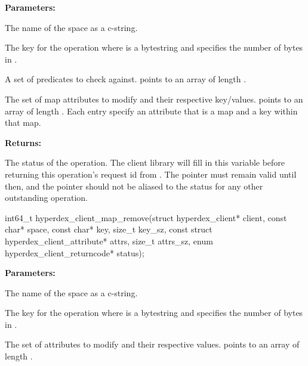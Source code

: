 \noindent\textbf{Parameters:}
\begin{description}[labelindent=\widthof{{\code{mapattrs}, \code{mapattrs\_sz}}},leftmargin=*,noitemsep,nolistsep,align=right]
\item[\code{space}] The name of the space as a c-string.
\item[\code{key}, \code{key\_sz}] The key for the operation where  is a bytestring and  specifies the number of bytes in .
\item[\code{checks}, \code{checks\_sz}] A set of predicates to check against.   points to an array of length .
\item[\code{mapattrs}, \code{mapattrs\_sz}] The set of map attributes to modify and their respective key/values.   points to an array of length .  Each entry specify an attribute that is a map and a key within that map.
\end{description}

\noindent\textbf{Returns:}
\begin{description}[labelindent=\widthof{{\code{status}}},leftmargin=*,noitemsep,nolistsep,align=right]
\item[\code{status}] The status of the operation.  The client library will fill in this variable before returning this operation's request id from .  The pointer must remain valid until then, and the pointer should not be aliased to the status for any other outstanding operation.
\end{description}

\funcsep
{}
\begin{ccode}
int64_t hyperdex_client_map_remove(struct hyperdex_client* client,
                const char* space,
                const char* key, size_t key_sz,
                const struct hyperdex_client_attribute* attrs, size_t attrs_sz,
                enum hyperdex_client_returncode* status);
\end{ccode}
\funcdesc 

\noindent\textbf{Parameters:}
\begin{description}[labelindent=\widthof{{\code{attrs}, \code{attrs\_sz}}},leftmargin=*,noitemsep,nolistsep,align=right]
\item[\code{space}] The name of the space as a c-string.
\item[\code{key}, \code{key\_sz}] The key for the operation where  is a bytestring and  specifies the number of bytes in .
\item[\code{attrs}, \code{attrs\_sz}] The set of attributes to modify and their respective values.   points to an array of length .
\end{description}

